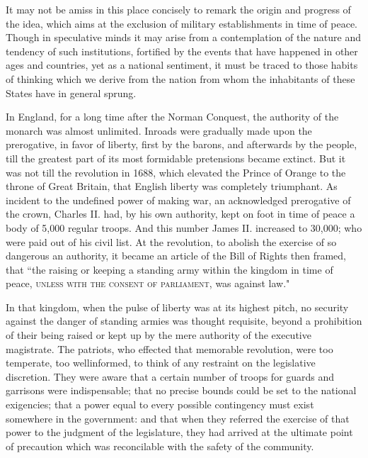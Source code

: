 It may not be amiss in this place concisely to remark the origin and progress of the idea, which aims at the exclusion of military establishments in time of peace. Though in speculative minds it may arise from a contemplation of the nature and tendency of such institutions, fortified by the events that have happened in other ages and countries, yet as a national sentiment, it must be traced to those habits of thinking which we derive from the nation from whom the inhabitants of these States have in general sprung.

In England, for a long time after the Norman Conquest, the authority of the monarch was almost unlimited. Inroads were gradually made upon the prerogative, in favor of liberty, first by the barons, and afterwards by the people, till the greatest part of its most formidable pretensions became extinct. But it was not till the revolution in 1688, which elevated the Prince of Orange to the throne of Great Britain, that English liberty was completely triumphant. As incident to the undefined power of making war, an acknowledged prerogative of the crown, Charles II. had, by his own authority, kept on foot in time of peace a body of 5,000 regular troops. And this number James II. increased to 30,000; who were paid out of his civil list. At the revolution, to abolish the exercise of so dangerous an authority, it became an article of the Bill of Rights then framed, that ``the raising or keeping a standing army within the kingdom in time of peace, \textsc{unless with the consent of parliament}, was against law."

In that kingdom, when the pulse of liberty was at its highest pitch, no security against the danger of standing armies was thought requisite, beyond a prohibition of their being raised or kept up by the mere authority of the executive magistrate. The patriots, who effected that memorable revolution, were too temperate, too wellinformed, to think of any restraint on the legislative discretion. They were aware that a certain number of troops for guards and garrisons were indispensable; that no precise bounds could be set to the national exigencies; that a power equal to every possible contingency must exist somewhere in the government: and that when they referred the exercise of that power to the judgment of the legislature, they had arrived at the ultimate point of precaution which was reconcilable with the safety of the community.

